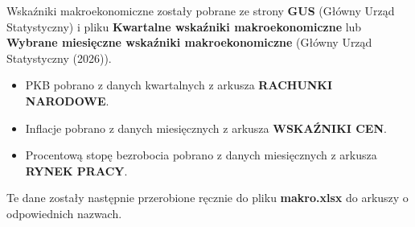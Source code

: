 \documentclass[
  polish,
  letterpaper,
  DIV=11,
  numbers=noendperiod]{scrartcl}
\newenvironment{Shaded}{\begin{snugshade}}{\end{snugshade}}
\newcommand{\AttributeTok}[1]{\textcolor[rgb]{0.40,0.45,0.13}{#1}}
\newcommand{\CommentTok}[1]{\textcolor[rgb]{0.37,0.37,0.37}{#1}}
\newcommand{\DecValTok}[1]{\textcolor[rgb]{0.68,0.00,0.00}{#1}}
\newcommand{\FunctionTok}[1]{\textcolor[rgb]{0.28,0.35,0.67}{#1}}
\newcommand{\NormalTok}[1]{\textcolor[rgb]{0.00,0.23,0.31}{#1}}
\newcommand{\OtherTok}[1]{\textcolor[rgb]{0.00,0.23,0.31}{#1}}
\newcommand{\SpecialCharTok}[1]{\textcolor[rgb]{0.37,0.37,0.37}{#1}}
\newcommand{\StringTok}[1]{\textcolor[rgb]{0.13,0.47,0.30}{#1}}
\providecommand{\tightlist}{%
  \setlength{\itemsep}{0pt}\setlength{\parskip}{0pt}}
\begin{document}
Wskaźniki makroekonomiczne zostały pobrane ze strony \textbf{GUS}
(Główny Urząd Statystyczny) i pliku \textbf{Kwartalne wskaźniki
makroekonomiczne} lub \textbf{Wybrane miesięczne wskaźniki
makroekonomiczne} {(Główny Urząd Statystyczny (2026))}.

\begin{itemize}
\tightlist
\item
  PKB pobrano z danych kwartalnych z arkusza \textbf{RACHUNKI NARODOWE}.
\item
  Inflacje pobrano z danych miesięcznych z arkusza \textbf{WSKAŹNIKI
  CEN}.
\item
  Procentową stopę bezrobocia pobrano z danych miesięcznych z arkusza
  \textbf{RYNEK PRACY}.
\end{itemize}

Te dane zostały następnie przerobione ręcznie do pliku
\textbf{makro.xlsx} do arkuszy o odpowiednich nazwach.

\begin{Shaded}
\end{Shaded}
\end{document}
